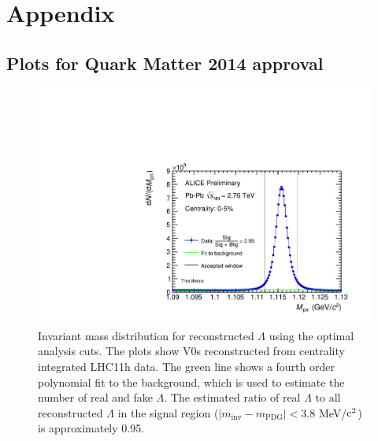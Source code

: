 \section{Appendix}
\subsection{Plots for Quark Matter 2014 approval}
\begin{figure}[hbtp]
\includegraphics[width=36pc]{Figures/2014-05-11-LamMinv-CommentCorrections.pdf}
\caption[$\Lambda$ invariant mass distribution]{Invariant mass distribution for reconstructed $\Lambda$ using the optimal analysis cuts.  The plots show V0s reconstructed from centrality integrated LHC11h data.  The green line shows a fourth order polynomial fit to the background, which is used to estimate the number of real and fake $\Lambda$.  The estimated ratio of real $\Lambda$ to all reconstructed $\Lambda$ in the signal region ($ \lvert m_{\mathrm{inv}} - m_{\mathrm{PDG}}\rvert < 3.8$ MeV/$\rm c^2$) is approximately 0.95.}
\label{fig:AppendixLamInvMass}
\end{figure}


